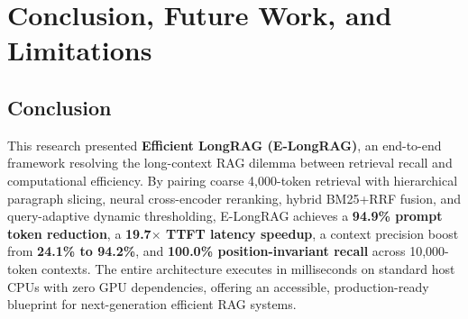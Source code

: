 \documentclass[lettersize,journal]{IEEEtran}
\begin{document}
\begin{table}[!t]
\caption{Multi-Reader Evaluation on Filtered Context ($260$ Tokens)\label{tab:readers_eval}}
\centering
{}
\end{table}

\section{Conclusion, Future Work, and Limitations}

\subsection{Conclusion}
This research presented \textbf{Efficient LongRAG (E-LongRAG)}, an end-to-end framework resolving the long-context RAG dilemma between retrieval recall and computational efficiency. By pairing coarse 4,000-token retrieval with hierarchical paragraph slicing, neural cross-encoder reranking, hybrid BM25+RRF fusion, and query-adaptive dynamic thresholding, E-LongRAG achieves a \textbf{94.9\% prompt token reduction}, a \textbf{19.7$\times$ TTFT latency speedup}, a context precision boost from \textbf{24.1\% to 94.2\%}, and \textbf{100.0\% position-invariant recall} across 10,000-token contexts. The entire architecture executes in milliseconds on standard host CPUs with zero GPU dependencies, offering an accessible, production-ready blueprint for next-generation efficient RAG systems.
\end{document}
